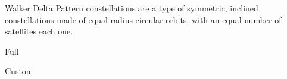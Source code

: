 
Walker Delta Pattern constellations are a type of symmetric, inclined constellations made of equal-radius circular orbits, with an equal number of satellites each one.

{Full}

{Custom}